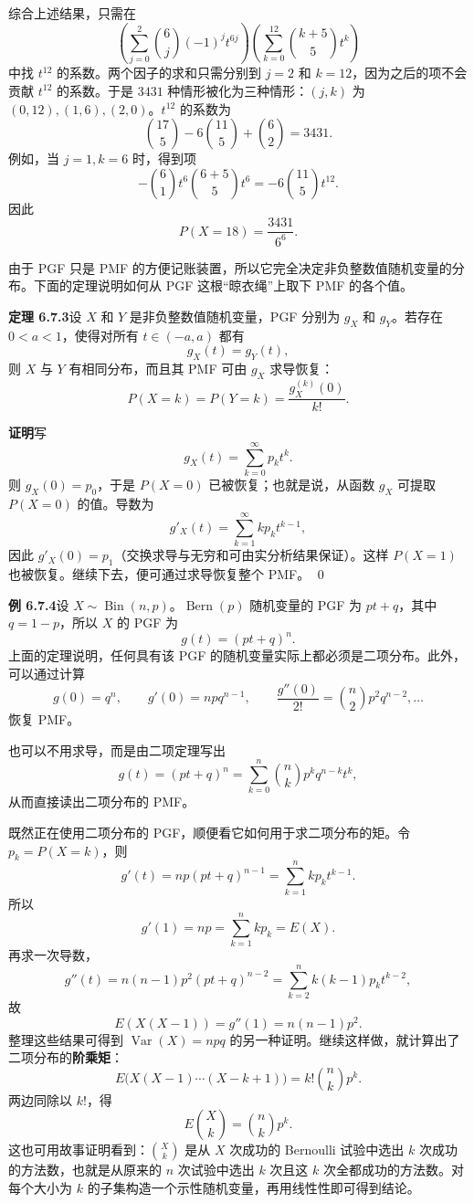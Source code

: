 \documentclass[UTF8,12pt,a4paper,fontset=fandol]{ctexart}
\begin{document}
综合上述结果，只需在
\[
  \left(\sum_{j=0}^{2}\binom{6}{j}(-1)^jt^{6j}\right)
  \left(\sum_{k=0}^{12}\binom{k+5}{5}t^k\right)
\]
中找 $t^{12}$ 的系数。两个因子的求和只需分别到 $j=2$ 和 $k=12$，因为之后的项不会贡献 $t^{12}$ 的系数。于是 $3431$ 种情形被化为三种情形：$(j,k)$ 为 $(0,12),(1,6),(2,0)$。$t^{12}$ 的系数为
\[
  \binom{17}{5}-6\binom{11}{5}+\binom{6}{2}=3431.
\]
例如，当 $j=1,k=6$ 时，得到项
\[
  -\binom61t^6\binom{6+5}{5}t^6=-6\binom{11}{5}t^{12}.
\]
因此
\[
  P(X=18)=\frac{3431}{6^6}.
\]

由于 PGF 只是 PMF 的方便记账装置，所以它完全决定非负整数值随机变量的分布。下面的定理说明如何从 PGF 这根“晾衣绳”上取下 PMF 的各个值。

\noindent\textbf{定理 6.7.3}\quad 设 $X$ 和 $Y$ 是非负整数值随机变量，PGF 分别为 $g_X$ 和 $g_Y$。若存在 $0<a<1$，使得对所有 $t\in(-a,a)$ 都有
\[
  g_X(t)=g_Y(t),
\]
则 $X$ 与 $Y$ 有相同分布，而且其 PMF 可由 $g_X$ 求导恢复：
\[
  P(X=k)=P(Y=k)=\frac{g_X^{(k)}(0)}{k!}.
\]

\noindent\textbf{证明}\quad 写
\[
  g_X(t)=\sum_{k=0}^{\infty}p_kt^k.
\]
则 $g_X(0)=p_0$，于是 $P(X=0)$ 已被恢复；也就是说，从函数 $g_X$ 可提取 $P(X=0)$ 的值。导数为
\[
  g'_X(t)=\sum_{k=1}^{\infty}kp_kt^{k-1},
\]
因此 $g'_X(0)=p_1$（交换求导与无穷和可由实分析结果保证）。这样 $P(X=1)$ 也被恢复。继续下去，便可通过求导恢复整个 PMF。
\qed

\noindent\textbf{例 6.7.4}\quad 设 $X\sim\operatorname{Bin}(n,p)$。$\operatorname{Bern}(p)$ 随机变量的 PGF 为 $pt+q$，其中 $q=1-p$，所以 $X$ 的 PGF 为
\[
  g(t)=(pt+q)^n.
\]
上面的定理说明，任何具有该 PGF 的随机变量实际上都必须是二项分布。此外，可以通过计算
\[
  g(0)=q^n,\qquad
  g'(0)=npq^{n-1},\qquad
  \frac{g''(0)}{2!}=\binom{n}{2}p^2q^{n-2},\ldots
\]
恢复 PMF。

也可以不用求导，而是由二项定理写出
\[
  g(t)=(pt+q)^n=\sum_{k=0}^{n}\binom{n}{k}p^kq^{n-k}t^k,
\]
从而直接读出二项分布的 PMF。

既然正在使用二项分布的 PGF，顺便看它如何用于求二项分布的矩。令 $p_k=P(X=k)$，则
\[
  g'(t)=np(pt+q)^{n-1}=\sum_{k=1}^n kp_kt^{k-1}.
\]
所以
\[
  g'(1)=np=\sum_{k=1}^{n}kp_k=E(X).
\]
再求一次导数，
\[
  g''(t)=n(n-1)p^2(pt+q)^{n-2}
  =
  \sum_{k=2}^{n}k(k-1)p_kt^{k-2},
\]
故
\[
  E(X(X-1))=g''(1)=n(n-1)p^2.
\]
整理这些结果可得到 $\operatorname{Var}(X)=npq$ 的另一种证明。继续这样做，就计算出了二项分布的\textbf{阶乘矩}：
\[
  E\bigl(X(X-1)\cdots(X-k+1)\bigr)=k!\binom{n}{k}p^k.
\]
两边同除以 $k!$，得
\[
  E\binom{X}{k}=\binom{n}{k}p^k.
\]
这也可用故事证明看到：$\binom{X}{k}$ 是从 $X$ 次成功的 Bernoulli 试验中选出 $k$ 次成功的方法数，也就是从原来的 $n$ 次试验中选出 $k$ 次且这 $k$ 次全都成功的方法数。对每个大小为 $k$ 的子集构造一个示性随机变量，再用线性性即可得到结论。
\end{document}
